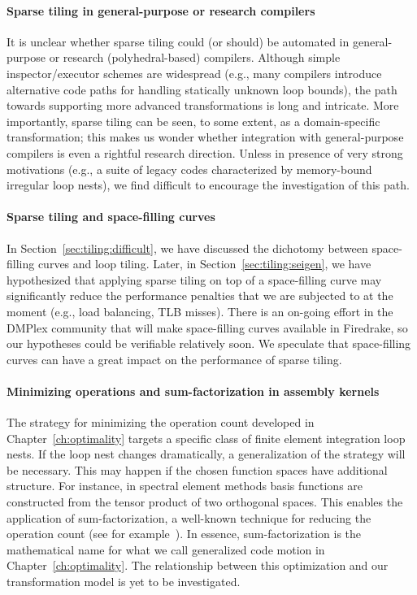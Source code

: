 \paragraph{Sparse tiling in general-purpose or research compilers}
It is unclear whether sparse tiling could (or should) be automated in general-purpose or research (polyhedral-based) compilers. Although simple inspector/executor schemes are widespread (e.g., many compilers introduce alternative code paths for handling statically unknown loop bounds), the path towards supporting more advanced transformations is long and intricate. More importantly, sparse tiling can be seen, to some extent, as a domain-specific transformation; this makes us wonder whether integration with general-purpose compilers is even a rightful research direction. Unless in presence of very strong motivations (e.g., a suite of legacy codes characterized by memory-bound irregular loop nests), we find difficult to encourage the investigation of this path.

\paragraph{Sparse tiling and space-filling curves}
In Section~\ref{sec:tiling:difficult}, we have discussed the dichotomy between space-filling curves and loop tiling. Later, in Section~\ref{sec:tiling:seigen}, we have hypothesized that applying sparse tiling on top of a space-filling curve may significantly reduce the performance penalties that we are subjected to at the moment (e.g., load balancing, TLB misses). There is an on-going effort in the DMPlex community that will make space-filling curves available in Firedrake, so our hypotheses could be verifiable relatively soon. We speculate that space-filling curves can have a great impact on the performance of sparse tiling.

\paragraph{Minimizing operations and sum-factorization in assembly kernels}
The strategy for minimizing the operation count developed in Chapter~\ref{ch:optimality} targets a specific class of finite element integration loop nests. If the loop nest changes dramatically, a generalization of the strategy will be necessary. This may happen if the chosen function spaces have additional structure. For instance, in spectral element methods basis functions are constructed from the tensor product of two orthogonal spaces. This enables the application of sum-factorization, a well-known technique for reducing the operation count (see for example~\cite{spencer}). In essence, sum-factorization is the mathematical name for what we call generalized code motion in Chapter~\ref{ch:optimality}. The relationship between this optimization and our transformation model is yet to be investigated.

